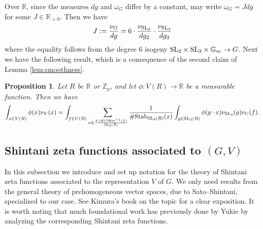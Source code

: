 \documentclass{article}
\def\Z{{\mathbb Z}}
\def\SL{{\rm SL}}
\def\Stab{{\rm Stab}}
\def\Res{{\rm Res}}
\def\R{{\mathbb R}}
\def\Z{{\mathbb Z}}
\newtheorem{proposition}[theorem]{Proposition}
\begin{document}
Over $\R$, since the measures $dg$ and $\omega_G$ differ by a constant, may write $\omega_G=Jdg$ for some $J\in\R_{>0}$. Then we have 
\begin{equation}\label{eq:J_def}
J:=\frac{\nu_G}{dg}=6\cdot\frac{\nu_{\SL_2}}{dg_2}\cdot\frac{\nu_{\SL_3}}{dg_3}
\end{equation}
where the equality follows from the degree 6 isogeny $\SL_2\times\SL_3\times\mathbb{G}_m\to G$.
Next we have the following result, which is a consequence of the second claim of Lemma \ref{lem:smoothness}.
\begin{proposition}\label{prop:jac_sl_3}
Let $R$ be $\R$ or $\Z_p$, and let $\phi:V(R)\to\R$ be a measurable function. Then we have
\begin{equation*}
\int_{x\in V(R)}\phi(x)\nu_V(x)=\int_{f\in U(R)}
\sum_{x\in \frac{V(R)\cap\Res^{-1}(f)}{\SL_3(R)}}
\frac{1}{\#\Stab_{\SL_3(R)}(x)}\int_{g\in\SL_3(R)}\phi(g\cdot x)\nu_{\SL_3}(g)\nu_U(f).
\end{equation*}
\end{proposition}





\subsection{Shintani zeta functions associated to $(G,V)$}

In this subsection we introduce and set up notation for the theory of Shintani zeta functions associated to the representation $V$ of $G$. We only need results from the general theory of prehomogeneous vector spaces, due to Sato--Shintani, specialized to our case. See Kimura's book on the topic \cite{Kimura_book} for a clear exposition. It is worth noting that much foundational work has previously done by Yukie \cite{Yukie} by analyzing the corresponding Shintani zeta functions.
\end{document}
